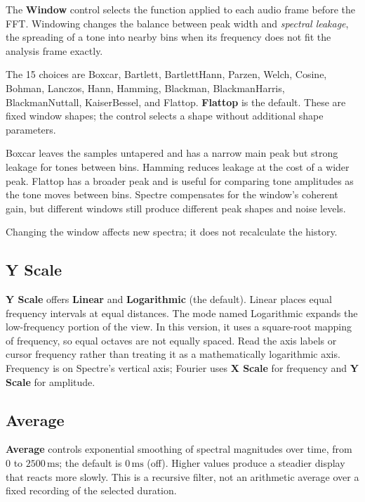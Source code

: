 \documentclass[12pt,letterpaper]{article}
\begin{document}
The \textbf{Window} control selects the function applied to each audio frame
before the FFT. Windowing changes the balance between peak width and
\textit{spectral leakage}, the spreading of a tone into nearby bins when its
frequency does not fit the analysis frame exactly.

The 15 choices are Boxcar, Bartlett, BartlettHann, Parzen, Welch, Cosine,
Bohman, Lanczos, Hann, Hamming, Blackman, BlackmanHarris, BlackmanNuttall,
KaiserBessel, and Flattop. \textbf{Flattop} is the default. These are fixed
window shapes; the control selects a shape without additional shape
parameters.

Boxcar leaves the samples untapered and has a narrow main peak but strong
leakage for tones between bins. Hamming reduces leakage at the cost of a wider
peak. Flattop has a broader peak and is useful for comparing tone amplitudes
as the tone moves between bins. Spectre compensates for the window's coherent
gain, but different windows still produce different peak shapes and noise
levels.

Changing the window affects new spectra; it does not recalculate the history.

\subsection{Y Scale}

\textbf{Y Scale} offers \textbf{Linear} and \textbf{Logarithmic} (the
default). Linear places equal frequency intervals at equal distances. The mode
named Logarithmic expands the low-frequency portion of the view. In this
version, it uses a square-root mapping of frequency, so equal octaves are not
equally spaced. Read the axis labels or cursor frequency rather than treating
it as a mathematically logarithmic axis. Frequency is on Spectre's vertical
axis; Fourier uses \textbf{X Scale} for frequency and \textbf{Y Scale} for
amplitude.

\subsection{Average}

\textbf{Average} controls exponential smoothing of spectral magnitudes over
time, from $0$ to $2500\,\mathrm{ms}$; the default is
\textbf{$0\,\mathrm{ms}$} (off). Higher values produce a steadier display that
reacts more slowly. This is a recursive filter, not an arithmetic average over
a fixed recording of the selected duration.
\end{document}
